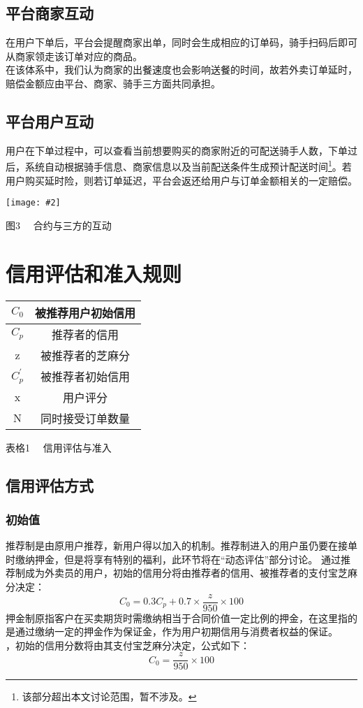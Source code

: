 \documentclass[UTF8]{ctexart}
\newcommand\picturehere[2][1]{\centerline{\texttt{[image: \#2]}}}
\newcommand\picfig[1]{\centerline{\small \heiti #1 \songti }}
\begin{document}
\begin{multicols}{2}
  \subsection{平台商家互动}
  \indent 在用户下单后，平台会提醒商家出单，同时会生成相应的订单码，骑手扫码后即可从商家领走该订单对应的商品。\\
  \indent 在该体系中，我们认为商家的出餐速度也会影响送餐的时间，故若外卖订单延时，赔偿金额应由平台、商家、骑手三方面共同承担。
  \subsection{平台用户互动}
  \indent 用户在下单过程中，可以查看当前想要购买的商家附近的可配送骑手人数，下单过后，系统自动根据骑手信息、商家信息以及当前配送条件生成预计配送时间\footnote{该部分超出本文讨论范围，暂不涉及。}。若用户购买延时险，则若订单延迟，平台会返还给用户与订单金额相关的一定赔偿。
  \picturehere[0.5]{image/contract.png}
  \picfig{图3 \ \ 合约与三方的互动}



  \section{信用评估和准入规则}
  \begin{table}[H]
    \centering
    \begin{tabular}{|c|c|}
      \hline
      $C_0$ & 被推荐用户初始信用 \\ \hline
      $C_p$ & 推荐者的信用 \\ \hline
      z &被推荐者的芝麻分\footnotemark[2]\\ \hline
      $C_p^{'}$ & 被推荐者初始信用 \\ \hline
      x & 用户评分 \\ \hline
      N & 同时接受订单数量 \\ \hline
    \end{tabular}
  \end{table}
  \picfig{表格1 \ \ 信用评估与准入}
  \subsection{信用评估方式}
  \subsubsection{初始值}
  \indent 推荐制是由原用户推荐，新用户得以加入的机制。推荐制进入的用户虽仍要在接单时缴纳押金，但是将享有特别的福利，此环节将在“动态评估”部分讨论。
  \indent 通过推荐制成为外卖员的用户，初始的信用分将由推荐者的信用、被推荐者的支付宝芝麻分决定：
  $$C_0=0.3 C_p + 0.7 \times \frac{z}{950} \times 100$$
  \indent 押金制原指客户在买卖期货时需缴纳相当于合同价值一定比例的押金，在这里指的是通过缴纳一定的押金作为保证金，作为用户初期信用与消费者权益的保证。\\
  ，初始的信用分数将由其支付宝芝麻分决定，公式如下：
  $$C_0=\frac{z}{950} \times 100$$

\end{multicols}
\end{document}
